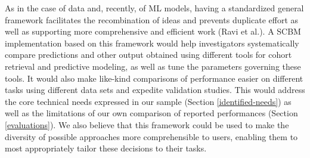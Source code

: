 \documentclass[sn-mathphys,Numbered,pdflatex]{sn-jnl}
\theoremstyle{remark}
\theoremstyle{definition}
\newcommand{\hl}[1]{#1}
\begin{document}
\hl{As in the case of data and, recently, of ML models, having a standardized general framework facilitates the recombination of ideas and prevents duplicate effort as well as supporting more comprehensive and efficient work (Ravi et al.). A SCBM implementation based on this framework would help investigators systematically compare predictions and other output obtained using different tools for cohort retrieval and predictive modeling, as well as tune the parameters governing these tools. It would also make like-kind comparisons of performance easier on different tasks using different data sets and expedite validation studies. This would address the core technical needs expressed in our sample (Section }\ref{identified-needs}\hl{)
as well as the limitations of our own comparison of reported
performances (Section }\ref{evaluations}\hl{).
We also believe that this framework could be used to make the diversity of possible approaches more comprehensible to users, enabling them to most appropriately tailor these decisions to their tasks.}

\small
\end{document}
